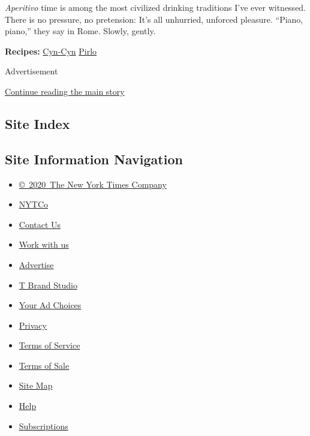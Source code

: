 \emph{Aperitivo} time is among the most civilized drinking traditions
I've ever witnessed. There is no pressure, no pretension: It's all
unhurried, unforced pleasure. ``Piano, piano,'' they say in Rome.
Slowly, gently.

\textbf{Recipes:}
\href{https://cooking.nytimes3xbfgragh.onion/recipes/1018598-cyn-cyn}{Cyn-Cyn}
\textbar{}
\href{https://cooking.nytimes3xbfgragh.onion/recipes/1018597-pirlo}{Pirlo}

Advertisement

\protect\hyperlink{after-bottom}{Continue reading the main story}

\hypertarget{site-index}{%
\subsection{Site Index}\label{site-index}}

\hypertarget{site-information-navigation}{%
\subsection{Site Information
Navigation}\label{site-information-navigation}}

\begin{itemize}
\tightlist
\item
  \href{https://help.nytimes3xbfgragh.onion/hc/en-us/articles/115014792127-Copyright-notice}{©~2020~The
  New York Times Company}
\end{itemize}

\begin{itemize}
\tightlist
\item
  \href{https://www.nytco.com/}{NYTCo}
\item
  \href{https://help.nytimes3xbfgragh.onion/hc/en-us/articles/115015385887-Contact-Us}{Contact
  Us}
\item
  \href{https://www.nytco.com/careers/}{Work with us}
\item
  \href{https://nytmediakit.com/}{Advertise}
\item
  \href{http://www.tbrandstudio.com/}{T Brand Studio}
\item
  \href{https://www.nytimes3xbfgragh.onion/privacy/cookie-policy\#how-do-i-manage-trackers}{Your
  Ad Choices}
\item
  \href{https://www.nytimes3xbfgragh.onion/privacy}{Privacy}
\item
  \href{https://help.nytimes3xbfgragh.onion/hc/en-us/articles/115014893428-Terms-of-service}{Terms
  of Service}
\item
  \href{https://help.nytimes3xbfgragh.onion/hc/en-us/articles/115014893968-Terms-of-sale}{Terms
  of Sale}
\item
  \href{https://spiderbites.nytimes3xbfgragh.onion}{Site Map}
\item
  \href{https://help.nytimes3xbfgragh.onion/hc/en-us}{Help}
\item
  \href{https://www.nytimes3xbfgragh.onion/subscription?campaignId=37WXW}{Subscriptions}
\end{itemize}
